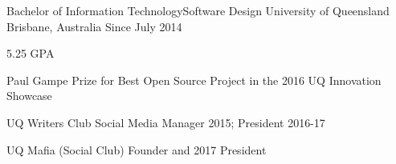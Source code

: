 


\begin{cventries}


\cventry
{Bachelor of Information Technology{\enskip\cdotp\enskip}Software Design} %
{University of Queensland} %
{Brisbane, Australia} %
{Since July 2014} %
{ %
\begin{cvitems}
\item 5.25 GPA
\item {Paul Gampe Prize for Best Open Source Project in the 2016 UQ Innovation Showcase}
\item {UQ Writers Club Social Media Manager 2015; President 2016-17}
\item {UQ Mafia (Social Club) Founder and 2017 President}
\end{cvitems}
}


\end{cventries}